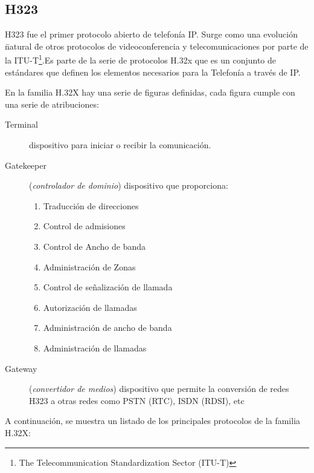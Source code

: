 \subsection{H323}

H323 fue el primer protocolo abierto de telefonía IP. Surge como una evolución \" natural \" de otros protocolos de videoconferencia y telecomunicaciones por parte de la ITU-T\footnote{The Telecommunication Standardization Sector (ITU-T)}.Es parte de la serie de protocolos H.32x que es un conjunto de estándares que definen los elementos necesarios para la Telefonía a través de IP.

En la familia H.32X hay una serie de figuras definidas, cada figura cumple con una serie de atribuciones:  
\begin{description}

\item[Terminal] dispositivo para iniciar o recibir la comunicación.
\item[Gatekeeper] (\emph{controlador de dominio}) dispositivo que proporciona:
  \begin{enumerate}
  \item Traducción de direcciones
  \item Control de admisiones
  \item Control de Ancho de banda
  \item Administración de Zonas
  \item Control de señalización de llamada
  \item Autorización de llamadas
  \item Administración de ancho de banda
  \item Administración de llamadas
  \end{enumerate}

\item[Gateway] (\emph{convertidor de medios}) dispositivo que permite la conversión de redes H323 a otras redes como PSTN (RTC), ISDN (RDSI), etc 
\end{description}

A continuación, se muestra un listado de los principales protocolos de la familia H.32X:


